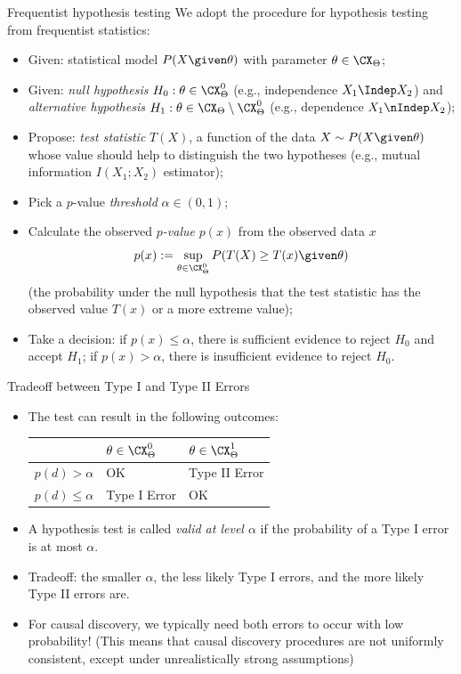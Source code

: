 \begin{frame}{Frequentist hypothesis testing}
  We adopt the procedure for hypothesis testing from frequentist statistics:   
  \begin{itemize}
    \item Given: statistical model $P(X\given \theta)$ with parameter $\theta \in \CX_\Theta$;
    \item Given: \emph{null hypothesis} $H_0 : \theta \in \CX_\Theta^0$
      (e.g., independence $X_1 \Indep X_2$) and \emph{alternative hypothesis} $H_1 : \theta \in \CX_\Theta\setminus\CX_\Theta^0$ 
      (e.g., dependence $X_1 \nIndep X_2$);
    \item Propose: \emph{test statistic} $T(X)$, a function of the data $X \sim P(X \given \theta)$
      whose value should help to distinguish the two hypotheses (e.g., mutual information $I(X_1;X_2)$ estimator);
    \item Pick a $p$-value \emph{threshold} $\alpha \in (0,1)$;
    \item Calculate the observed \emph{$p$-value} $p(x)$ from the observed data $x$
$$p(x) := \sup_{\theta\in\CX_\Theta^0} P(T(X) \ge T(x) \given \theta)$$
      (the probability under the null hypothesis that the test statistic has the observed value $T(x)$ or a more extreme value);
    \item Take a decision:
      if $p(x) \le \alpha$, there is sufficient evidence to reject $H_0$ and accept $H_1$;
      if $p(x) > \alpha$, there is insufficient evidence to reject $H_0$.
  \end{itemize}
\end{frame}

\begin{frame}{Tradeoff between Type I and Type II Errors}
  \begin{itemize}
    \item The test can result in the following outcomes:

      \medskip
  \begin{center}\begin{tabular}{l|ll}
                      & $\theta \in \CX_\Theta^0$ & $\theta \in \CX_\Theta^1$ \\
    \hline
    $p(d) > \alpha$   & OK    & Type II Error \\
    $p(d) \le \alpha$ & Type I Error & OK 
  \end{tabular}\end{center}
      \medskip

    \item A hypothesis test is called \emph{valid at level $\alpha$} if the probability of a Type I error is at most $\alpha$.
    \item Tradeoff: the smaller $\alpha$, the less likely Type I errors, and the more likely Type II errors are.
    \item For causal discovery, we typically need both errors to occur with low probability!
      (This means that causal discovery procedures are not uniformly consistent, except under unrealistically strong assumptions)
  \end{itemize}
\end{frame}

